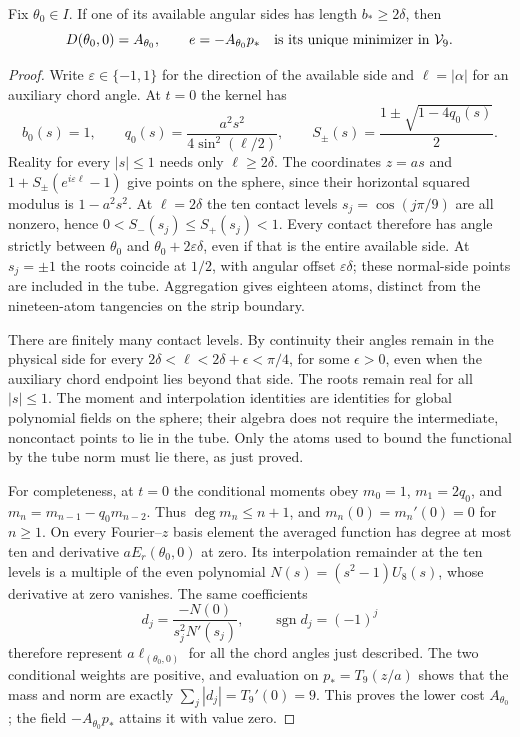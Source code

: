 \documentclass[11pt,a4paper]{article}
\begin{document}
\begin{lemma}\label{lem:rigidity}
Fix $\theta_0\in I$. If one of its available angular sides has
length $b_*\ge2\delta$, then
\[
 D(\theta_0,0)=A_{\theta_0},\qquad
 e=-A_{\theta_0}p_*\quad\text{is its unique minimizer in }\mathcal V_9.
\]
\end{lemma}
\begin{proof}
Write $\varepsilon\in\{-1,1\}$ for the direction of the available
side and $\ell=|\alpha|$ for an auxiliary chord angle. At $t=0$
the kernel has
\[
 b_0(s)=1,\qquad q_0(s)=\frac{a^2s^2}{4\sin^2(\ell/2)},\qquad
 S_\pm(s)=\frac{1\pm\sqrt{1-4q_0(s)}}2.
\]
Reality for every $|s|\le1$ needs only $\ell\ge2\delta$.
The coordinates $z=as$ and $1+S_\pm(e^{i\varepsilon\ell}-1)$
give points on the sphere, since their horizontal squared modulus
is $1-a^2s^2$. At $\ell=2\delta$ the ten contact levels
$s_j=\cos(j\pi/9)$ are all nonzero, hence
$0<S_-(s_j)\le S_+(s_j)<1$.
Every contact therefore has angle strictly between $\theta_0$
and $\theta_0+2\varepsilon\delta$, even if that is the entire
available side. At $s_j=\pm1$ the roots coincide at $1/2$,
with angular offset $\varepsilon\delta$; these normal-side
points are included in the tube. Aggregation gives eighteen atoms,
distinct from the nineteen-atom tangencies on the strip boundary.

There are finitely many contact levels. By continuity their angles
remain in the physical side for every
$2\delta<\ell<2\delta+\epsilon<\pi/4$, for some $\epsilon>0$,
even when the auxiliary chord endpoint lies beyond that side.
The roots remain real for all $|s|\le1$. The moment and
interpolation identities are identities for global polynomial
fields on the sphere; their algebra does not require the
intermediate, noncontact points to lie in the tube.
Only the atoms used to bound the functional by the tube norm
must lie there, as just proved.

For completeness, at $t=0$ the conditional moments obey
$m_0=1$, $m_1=2q_0$, and
$m_n=m_{n-1}-q_0m_{n-2}$. Thus $\deg m_n\le n+1$,
and $m_n(0)=m_n'(0)=0$ for $n\ge1$.
On every Fourier--$z$ basis element the averaged function has
degree at most ten and derivative $aE_r(\theta_0,0)$ at zero.
Its interpolation remainder at the ten levels is a multiple
of the even polynomial $N(s)=(s^2-1)U_8(s)$, whose derivative
at zero vanishes. The same coefficients
\[
 d_j=\frac{-N(0)}{s_j^2N'(s_j)},\qquad
 \operatorname{sgn}d_j=(-1)^j
\]
therefore represent $a\ell_{(\theta_0,0)}$ for all the chord
angles just described. The two conditional weights are positive,
and evaluation on $p_*=T_9(z/a)$ shows that the mass and norm
are exactly $\sum_j|d_j|=T_9'(0)=9$.
This proves the lower cost $A_{\theta_0}$; the field
$-A_{\theta_0}p_*$ attains it with value zero.


\end{proof}
\end{document}
